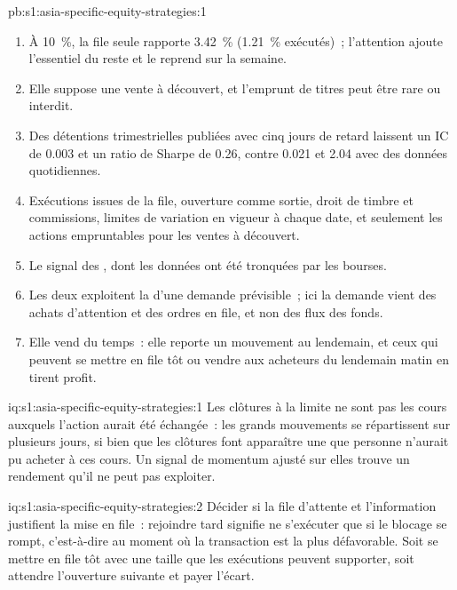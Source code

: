 \begin{solution}{pb:s1:asia-specific-equity-strategies:1}
\begin{enumerate}
de variation de cours, un acheteur en file pondéré par les exécutions 2.12~\%, 2.64~\% et 3.20~\%, et le cours rend 1.76~\%, 2.81~\% et 5.27~\% sur la semaine suivante.
\item À 10~\%, la file seule rapporte 3.42~\% (1.21~\% exécutés)~; l'attention ajoute l'essentiel du reste et le reprend sur la semaine.
\item Elle suppose une vente à découvert, et l'emprunt de titres peut être rare ou interdit.
\item Des détentions trimestrielles publiées avec cinq jours de retard laissent un IC de 0.003 et un ratio de Sharpe de 0.26, contre 0.021 et 2.04 avec des données quotidiennes.
\item Exécutions issues de la file, ouverture comme sortie, droit de timbre et commissions, limites de variation en vigueur à chaque date, et seulement les actions empruntables pour les ventes à découvert.
\item Le signal des , dont les données ont été tronquées par les bourses.
\item Les deux exploitent la  d'une demande prévisible~; ici la demande vient des achats d'attention et des ordres en file, et non des flux des fonds.
\item Elle vend du temps~: elle reporte un mouvement au lendemain, et ceux qui peuvent se mettre en file tôt ou vendre aux acheteurs du lendemain matin en tirent profit.
\end{enumerate}
\end{solution}

\begin{solution}{iq:s1:asia-specific-equity-strategies:1}
Les clôtures à la limite ne sont pas les cours auxquels l'action aurait été échangée~: les grands mouvements se répartissent sur plusieurs jours, si bien que les clôtures font apparaître une 
que personne n'aurait pu acheter à ces cours. Un signal de momentum ajusté sur elles trouve un rendement qu'il ne peut pas exploiter.
\end{solution}

\begin{solution}{iq:s1:asia-specific-equity-strategies:2}
Décider si la file d'attente et l'information justifient la mise en file~: rejoindre tard signifie ne s'exécuter que si le blocage se rompt, c'est-à-dire au moment où la transaction est la plus défavorable. Soit
se mettre en file tôt avec une taille que les exécutions peuvent supporter, soit attendre l'ouverture suivante et payer l'écart.
\end{solution}


